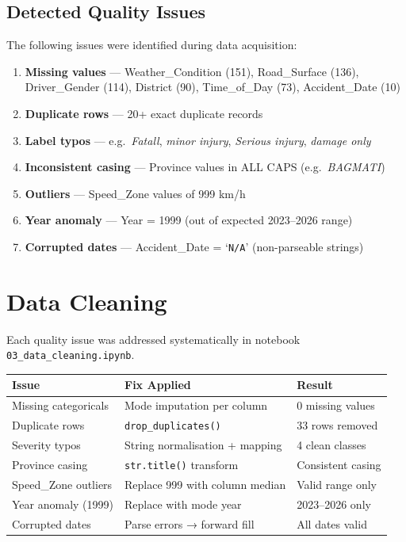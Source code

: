 \documentclass[12pt,a4paper]{article}
\begin{document}
\subsection{Detected Quality Issues}
The following issues were identified during data acquisition:

\begin{enumerate}
    \item \textbf{Missing values} — Weather\_Condition (151), Road\_Surface (136), Driver\_Gender (114), District (90), Time\_of\_Day (73), Accident\_Date (10)
    \item \textbf{Duplicate rows} — 20+ exact duplicate records
    \item \textbf{Label typos} — e.g.\ \textit{Fatall}, \textit{minor injury}, \textit{Serious injury}, \textit{damage only}
    \item \textbf{Inconsistent casing} — Province values in ALL CAPS (e.g.\ \textit{BAGMATI})
    \item \textbf{Outliers} — Speed\_Zone values of 999 km/h
    \item \textbf{Year anomaly} — Year = 1999 (out of expected 2023–2026 range)
    \item \textbf{Corrupted dates} — Accident\_Date = `\texttt{N/A}' (non-parseable strings)
\end{enumerate}

\section{Data Cleaning}

Each quality issue was addressed systematically in notebook \texttt{03\_data\_cleaning.ipynb}.

\begin{center}
\begin{tabular}{lll}
\toprule
\textbf{Issue} & \textbf{Fix Applied} & \textbf{Result} \\
\midrule
Missing categoricals & Mode imputation per column    & 0 missing values \\
Duplicate rows       & \texttt{drop\_duplicates()}   & 33 rows removed \\
Severity typos       & String normalisation + mapping & 4 clean classes \\
Province casing      & \texttt{str.title()} transform & Consistent casing \\
Speed\_Zone outliers & Replace 999 with column median & Valid range only \\
Year anomaly (1999)  & Replace with mode year         & 2023–2026 only \\
Corrupted dates      & Parse errors → forward fill    & All dates valid \\
\bottomrule
\end{tabular}
\end{center}
\end{document}
